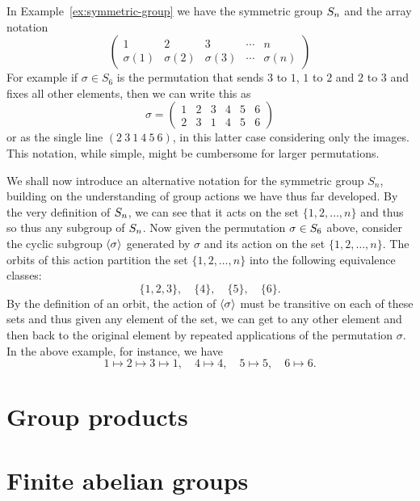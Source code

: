 In Example~\ref{ex:symmetric-group} we have the symmetric group \(S_{n}\) and
the array notation
\[
    \begin{pmatrix}
        1 & 2 & 3 & \cdots & n \\
        \sigma(1) & \sigma(2) & \sigma(3) & \cdots & \sigma(n)
    \end{pmatrix}
\]
For example if \(\sigma \in S_6\) is the permutation that sends \(3\) to \(1\),
\(1\) to \(2\) and \(2\) to \(3\) and fixes all other elements, then we can
write this as
\[
    \sigma = \begin{pmatrix}
        1 & 2 & 3 & 4 & 5 & 6 \\
        2 & 3 & 1 & 4 & 5 & 6
    \end{pmatrix}
\]
or as the single line \((2\ 3\ 1\ 4\ 5\ 6)\), in this latter case considering
only the images. This notation, while simple, might be cumbersome for larger
permutations. 

We shall now introduce an alternative notation for the symmetric group \(S_n\),
building on the understanding of group actions we have thus far developed. By
the very definition of \(S_{n}\), we can see that it acts on the set \(\{1,
2, \ldots, n\}\) and thus so thus any subgroup of \(S_{n}\). Now given the
permutation \(\sigma \in S_{6}\) above, consider the cyclic subgroup
\(\langle \sigma \rangle\) generated by \(\sigma\) and its action on the set \(\{1, 2,
\ldots, n\}\). The orbits of this action partition the set \(\{1, 2, \ldots,
n\}\) into  the following equivalence classes:
\[
    \{1, 2, 3\}, \quad \{4\}, \quad \{5\}, \quad \{6\}.
\]
By the definition of an orbit, the action of \(\langle \sigma \rangle\) must be transitive
on each of these sets and thus given any element of the set, we can get to any
other element and then back to the original element by repeated applications of
the permutation \(\sigma\). In the above example, for instance, we have
\[
    1 \mapsto 2 \mapsto 3 \mapsto 1, \quad 4 \mapsto 4, \quad 5 \mapsto 5, \quad 6 \mapsto 6.
\]
\section{Group products}

\section{Finite abelian groups}